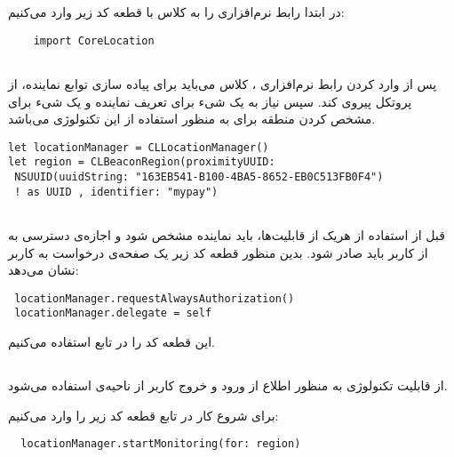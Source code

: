 \documentclass[oneside]{report}
\begin{document}
در ابتدا رابط نرم‌افزاری 
	{\normalsize {}}
	را به کلاس با قطعه کد زیر وارد می‌کنیم: 
	\begin{latin}
		\begin{verbatim}
	import CoreLocation
	
		\end{verbatim}
		
	\end{latin}	
	 پس از وارد کردن رابط نرم‌افزاری ، کلاس 
	 {\normalsize {}}
	 می‌باید برای پیاده سازی توابع نماینده، از پروتکل 
		 {\normalsize {}}
	پیروی کند. سپس نیاز به یک شیء برای  تعریف نماینده و یک شیء برای مشخص کردن منطقه برای 
					{\normalsize {}} 
	به منظور استفاده از این تکنولوژی می‌باشد. 
		\begin{latin}
		\begin{verbatim}
let locationManager = CLLocationManager()
let region = CLBeaconRegion(proximityUUID:
 NSUUID(uuidString: "163EB541-B100-4BA5-8652-EB0C513FB0F4")
 ! as UUID , identifier: "mypay")
		
		\end{verbatim}
		
	\end{latin}	
	قبل از استفاده از هریک از قابلیت‌ها، باید نماینده مشخص شود و اجازه‌ی دسترسی به 
					{\normalsize {}}
	از کاربر باید صادر شود. بدین منظور قطعه کد زیر یک صفحه‌ی درخواست به کاربر نشان می‌دهد: 
				\begin{latin}
				\begin{verbatim}
 locationManager.requestAlwaysAuthorization()
 locationManager.delegate = self

				\end{verbatim}
				
			\end{latin}	
		این قطعه کد را در تابع 
			{\normalsize {}}
			استفاده می‌کنیم.		 
	
	\subsection{{\small {}}}
	از قابلیت 
	{\normalsize {}}
	تکنولوژی
	{\normalsize {}}
	 به منظور اطلاع از ورود و خروج کاربر از ناحیه‌ی 
	{\normalsize {}}
	استفاده می‌شود.
	
	برای شروع کار 
	{\normalsize {}}
	در تابع 
	{\normalsize {}}
	قطعه کد زیر را وارد می‌کنیم:
	\begin{latin}
	\begin{verbatim}
  locationManager.startMonitoring(for: region)

	\end{verbatim}
	
\end{latin}		
	
\end{document}
